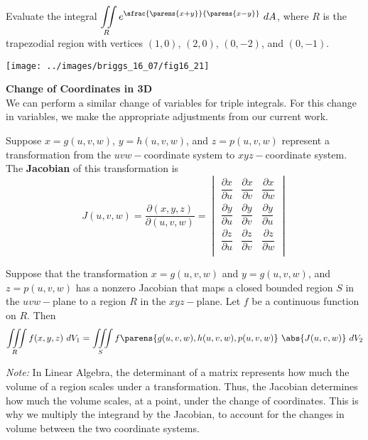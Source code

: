 \documentclass[../mathNotesPreamble]{subfiles}
\begin{document}
  \pagebreak
  \begin{ex*}
  Evaluate the integral $\displaystyle\iint\limits_R e^{\sfrac{\parens{x+y}}{\parens{x-y}}}~dA$, where $R$ is the trapezodial region with vertices $(1,0)$, $(2,0)$, $(0,-2)$, and $(0,-1).$
\begin{flushleft}
\texttt{[image: ../images/briggs\_16\_07/fig16\_21]}
\end{flushleft}
  \end{ex*}
  \pagebreak
  \noindent\textbf{Change of Coordinates in 3D}\\
  
  \noindent We can perform a similar change of variables for triple integrals. For this change in variables, we make the appropriate adjustments from our current work.
  \begin{defn*}[Jacobian in 3D]
  Suppose $x=g(u,v,w)$, $y=h(u,v,w)$, and $z=p(u,v,w)$ represent a transformation from the $uvw-$coordinate system to $xyz-$coordinate system. The \textbf{Jacobian} of this transformation is
  \[
  J(u,v,w)=\dfrac{\partial(x,y,z)}{\partial(u,v,w)}=\begin{vmatrix}
  \dfrac{\partial x}{\partial u}& \dfrac{\partial x}{\partial v}& \dfrac{\partial x}{\partial w}\\[2ex]
   \dfrac{\partial y}{\partial u}& \dfrac{\partial y}{\partial v}& \dfrac{\partial y}{\partial u}\\[2ex]
    \dfrac{\partial z}{\partial u}& \dfrac{\partial z}{\partial v}& \dfrac{\partial z}{\partial w}\\
  \end{vmatrix}
  \]
  \end{defn*}
  \begin{thmBox*}
Suppose that the transformation $x=g(u,v,w)$ and $y=g(u,v,w)$, and $z=p(u,v,w)$ has a nonzero Jacobian that maps a closed bounded region $S$ in the $uvw-$plane to a region $R$ in the $xyz-$plane. Let $f$ be a continuous function on $R$. Then
\[
\iiint\limits_R f(x,y,z)~dV_1=\iiint\limits_S f\parens{g(u,v,w),h(u,v,w),p(u,v,w)}
~\abs{J(u,v,w)}~dV_2\]
\end{thmBox*}
\noindent\textit{Note:} In Linear Algebra, the determinant of a matrix represents how much the volume of a region scales under a transformation. Thus, the Jacobian determines how much the volume scales, at a point, under the change of coordinates. This is why we multiply the integrand by the Jacobian, to account for the changes in volume between the two coordinate systems.
\end{document}
